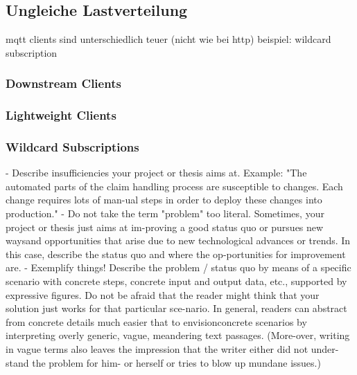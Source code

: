 \subsection{Ungleiche Lastverteilung}
mqtt clients sind unterschiedlich teuer (nicht wie bei http)
beispiel: wildcard subscription

\subsubsection{Downstream Clients}
\subsubsection{Lightweight Clients}
\subsubsection{Wildcard Subscriptions}

- Describe insufficiencies your project or thesis aims at. Example: "The automated parts of the claim handling process are susceptible to changes. Each change requires lots of man-ual steps in order to deploy these changes into production."
- Do not take the term "problem" too literal. Sometimes, your project or thesis just aims at im-proving a good status quo or pursues new waysand opportunities that arise due to new technological advances or trends. In this case, describe the status quo and where the op-portunities for improvement are.
- Exemplify things! Describe the problem / status quo by means of a specific scenario with concrete steps, concrete input and output data, etc., supported by expressive figures. Do not be afraid that the reader might think that your solution just works for that particular sce-nario. In general, readers can abstract from concrete details much easier that to envisionconcrete scenarios by interpreting overly generic, vague, meandering text passages. (More-over, writing in vague terms also leaves the impression that the writer either did not under-stand the problem for him- or herself or tries to blow up mundane issues.)

